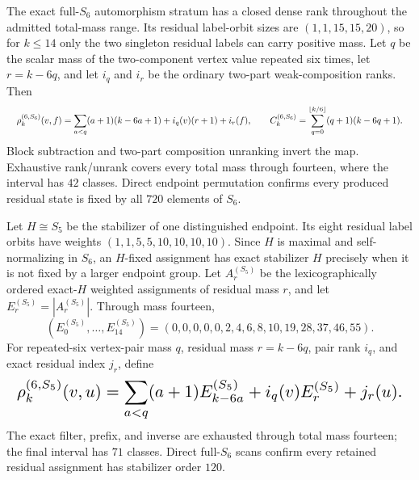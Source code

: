 \documentclass{article}
\newcommand{\fitmath}[1]{\resizebox{0.99\linewidth}{!}{$\displaystyle #1$}}
\begin{document}
The exact full-$S_6$ automorphism stratum has a closed dense rank throughout the
admitted total-mass range. Its residual label-orbit sizes are
$(1,1,15,15,20)$, so for $k\leq14$ only the two singleton residual labels can
carry positive mass. Let $q$ be the scalar mass of the two-component vertex
value repeated six times, let $r=k-6q$, and let $i_q$ and $i_r$ be the ordinary
two-part weak-composition ranks. Then
\begin{equation}
  \fitmath{%
    \rho_k^{(6,S_6)}(v,f)=
      \sum_{a<q}(a+1)(k-6a+1)+i_q(v)(r+1)+i_r(f),
    \qquad
    C_k^{(6,S_6)}=\sum_{q=0}^{\lfloor k/6\rfloor}(q+1)(k-6q+1).
  }
  \label{eq:optimization-crazy-sextuple-s6-full-s6-stabilizer-ranking}
\end{equation}
Block subtraction and two-part composition unranking invert the map. Exhaustive
rank/unrank covers every total mass through fourteen, where the interval has
$42$ classes. Direct endpoint permutation confirms every produced residual
state is fixed by all $720$ elements of $S_6$.

Let $H\cong S_5$ be the stabilizer of one distinguished endpoint. Its eight
residual label orbits have weights $(1,1,5,5,10,10,10,10)$. Since $H$ is
maximal and self-normalizing in $S_6$, an $H$-fixed assignment has exact
stabilizer $H$ precisely when it is not fixed by a larger endpoint group. Let
$A_r^{(S_5)}$ be the lexicographically ordered exact-$H$ weighted assignments
of residual mass $r$, and let $E_r^{(S_5)}=|A_r^{(S_5)}|$. Through mass
fourteen,
\[
  (E_0^{(S_5)},\ldots,E_{14}^{(S_5)})
   =(0,0,0,0,0,2,4,6,8,10,19,28,37,46,55).
\]
For repeated-six vertex-pair mass $q$, residual mass $r=k-6q$, pair rank $i_q$,
and exact residual index $j_r$, define
\begin{equation}
  \fitmath{%
    \rho_k^{(6,S_5)}(v,u)=
      \sum_{a<q}(a+1)E_{k-6a}^{(S_5)}
      +i_q(v)E_r^{(S_5)}+j_r(u).
  }
  \label{eq:optimization-crazy-sextuple-s6-full-s5-stabilizer-ranking}
\end{equation}
The exact filter, prefix, and inverse are exhausted through total mass fourteen;
the final interval has $71$ classes. Direct full-$S_6$ scans confirm every
retained residual assignment has stabilizer order $120$.
\end{document}
